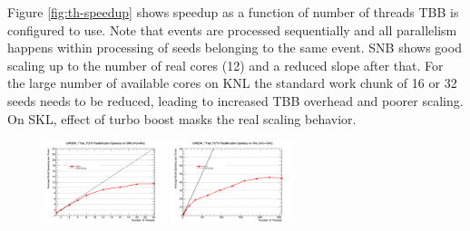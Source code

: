 \documentclass{webofc}
\def\threep{0.32\textwidth}
\begin{document}
Figure \ref{fig:th-speedup} shows speedup as a function of number of threads
TBB is configured to use. Note that events are processed sequentially and all
parallelism happens within processing of seeds belonging to the same
event. SNB shows good scaling up to the number of real cores (12) and a
reduced slope after that. For the large number of available cores on KNL the
standard work chunk of 16 or 32 seeds needs to be reduced, leading to
increased TBB overhead and poorer scaling. On SKL, effect of turbo boost masks
the real scaling behavior.

\begin{figure}[htb]
  \centering
  \includegraphics[width=\threep]{figs/comp/SNB_CMSSW_TTbar_PU70_TH_speedup.png}
  \hfill
  \includegraphics[width=\threep]{figs/comp/KNL_CMSSW_TTbar_PU70_TH_speedup.png}
  \hfill

\end{figure}
\end{document}
